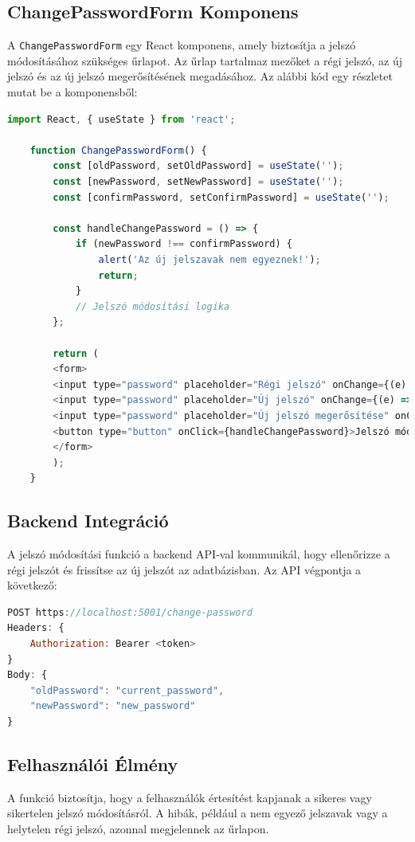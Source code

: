 \documentclass[colorlinks]{thesis-kando}
\theoremstyle{definition}
\theoremstyle{remark}
\begin{document}
\subsection{ChangePasswordForm Komponens}
A \texttt{ChangePasswordForm} egy React komponens, amely biztosítja a jelszó módosításához szükséges űrlapot. Az űrlap tartalmaz mezőket a régi jelszó, az új jelszó és az új jelszó megerősítésének megadásához. Az alábbi kód egy részletet mutat be a komponensből:

\begin{lstlisting}[language=JavaScript]
	import React, { useState } from 'react';
	
	function ChangePasswordForm() {
		const [oldPassword, setOldPassword] = useState('');
		const [newPassword, setNewPassword] = useState('');
		const [confirmPassword, setConfirmPassword] = useState('');
		
		const handleChangePassword = () => {
			if (newPassword !== confirmPassword) {
				alert('Az új jelszavak nem egyeznek!');
				return;
			}
			// Jelszó módosítási logika
		};
		
		return (
		<form>
		<input type="password" placeholder="Régi jelszó" onChange={(e) => setOldPassword(e.target.value)} />
		<input type="password" placeholder="Új jelszó" onChange={(e) => setNewPassword(e.target.value)} />
		<input type="password" placeholder="Új jelszó megerősítése" onChange={(e) => setConfirmPassword(e.target.value)} />
		<button type="button" onClick={handleChangePassword}>Jelszó módosítása</button>
		</form>
		);
	}
\end{lstlisting}

\subsection{Backend Integráció}
A jelszó módosítási funkció a backend API-val kommunikál, hogy ellenőrizze a régi jelszót és frissítse az új jelszót az adatbázisban. Az API végpontja a következő:

\begin{lstlisting}[language=JavaScript]
POST https://localhost:5001/change-password
Headers: {
    Authorization: Bearer <token>
}
Body: {
    "oldPassword": "current_password",
    "newPassword": "new_password"
}
\end{lstlisting}

\subsection{Felhasználói Élmény}
A funkció biztosítja, hogy a felhasználók értesítést kapjanak a sikeres vagy sikertelen jelszó módosításról. A hibák, például a nem egyező jelszavak vagy a helytelen régi jelszó, azonnal megjelennek az űrlapon.
\end{document}
